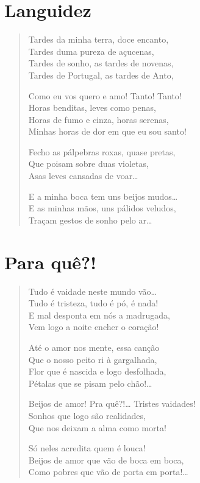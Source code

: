 \chapter{Languidez}

\begin{verse}
Tardes da minha terra, doce encanto,\\
Tardes duma pureza de açucenas,\\
Tardes de sonho, as tardes de novenas,\\
Tardes de Portugal, as tardes de Anto,

Como eu vos quero e amo! Tanto! Tanto!\\
Horas benditas, leves como penas,\\
Horas de fumo e cinza, horas serenas,\\
Minhas horas de dor em que eu sou santo!

Fecho as pálpebras roxas, quase pretas,\\
Que poisam sobre duas violetas,\\
Asas leves cansadas de voar\ldots{}

E a minha boca tem uns beijos mudos\ldots{}\\
E as minhas mãos, uns pálidos veludos,\\
Traçam gestos de sonho pelo ar\ldots{}
\end{verse}

\chapter{Para quê?!}

\begin{verse}
Tudo é vaidade neste mundo vão\ldots{}\\
Tudo é tristeza, tudo é pó, é nada!\\
E mal desponta em nós a madrugada,\\
Vem logo a noite encher o coração!

Até o amor nos mente, essa canção\\
Que o nosso peito ri à gargalhada,\\
Flor que é nascida e logo desfolhada,\\
Pétalas que se pisam pelo chão!\ldots{}

Beijos de amor! Pra quê?!\ldots{} Tristes vaidades!\\
Sonhos que logo são realidades,\\
Que nos deixam a alma como morta!

Só neles acredita quem é louca!\\
Beijos de amor que vão de boca em boca,\\
Como pobres que vão de porta em porta!\ldots{}
\end{verse}


